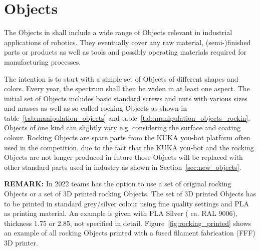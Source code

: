\clearpage
\section{Objects} \label{ssec:ManipulationObjects}
The Objects in \RCAW shall include a wide range of Objects relevant in industrial applications of robotics. They eventually cover any raw material, (semi-)finished parts or products as well as tools and possibly operating materials required for manufacturing processes.
\par

The intention is to start with a simple set of Objects of different shapes and colors. Every year, the spectrum shall then be widen in at least one aspect. 
The initial set of Objects includes basic standard screws and nuts with various sizes and masses as well as so called rocking Objects as shown in table~\ref{tab:manipulation_objects} and table~\ref{tab:manipulation_objects_rockin}. Objects of one kind can slightly vary e.g. considering the surface and coating colour. 
Rocking Objects are spare parts from the KUKA you-bot platform often used in the competition, due to the fact that the KUKA you-bot and the rocking Objects are not longer produced in future those Objects will be replaced with other standard parts used in industry as shown in Section~\ref{sec:new_objects}. 

\textbf{REMARK:} In 2022 teams has the option to use a set of original rocking Objects or a set of 3D printed rocking Objects. The set of 3D printed Objects has to be printed in standard grey/silver colour using fine quality settings and PLA as printing material. An example is given with PLA Silver ( ca. RAL 9006), thickness 1.75 or 2.85, not specified in detail.
Figure~\ref{fig:rocking_printed} shows an example of all rocking Objects printed with a fused filament fabrication (FFF) 3D printer. 




